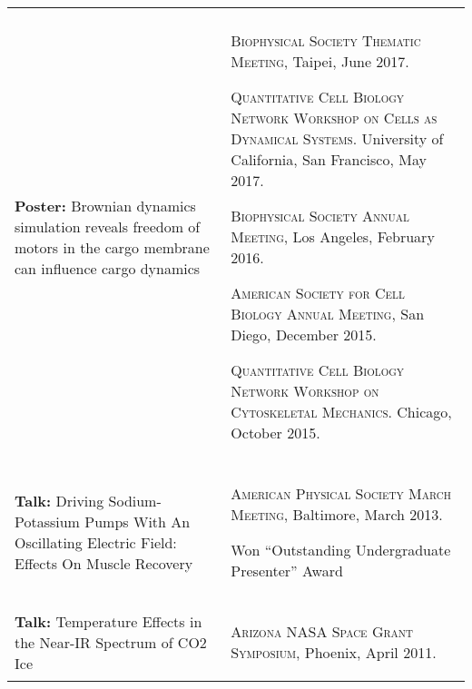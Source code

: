 \documentclass[letterpaper,10pt]{article} %
\makeatletter
\newcommand\cellwidth{\TX@col@width}
\makeatother
\begin{document}
\begin{tabularx}{\textwidth}{p{} | X}
\multicolumn{2}{c}{} \\

\begin{minipage}{.4\textwidth}
\textbf{Poster:} Brownian dynamics simulation reveals freedom of motors in the cargo membrane can influence cargo dynamics
\end{minipage}
&
\begin{minipage}{\cellwidth}
\begin{description}[itemsep=.25ex,labelsep=0em]
\item \textsc{Biophysical Society Thematic Meeting}, Taipei, June 2017.
\item \textsc{Quantitative Cell Biology Network Workshop on Cells as Dynamical Systems.} University of California, San Francisco, May 2017.
\item \textsc{Biophysical Society Annual Meeting}, Los Angeles, February 2016.
\item \textsc{American Society for Cell Biology Annual Meeting}, San Diego, December 2015.
\item \textsc{Quantitative Cell Biology Network Workshop on Cytoskeletal Mechanics.} Chicago, October 2015.
\end{description}
\end{minipage} \\

\multicolumn{2}{c}{} \\

\begin{minipage}{.4\textwidth}
\textbf{Talk:} Driving Sodium-Potassium Pumps With An Oscillating Electric Field: Effects On Muscle Recovery
\end{minipage}
&
\begin{minipage}{\cellwidth}
\begin{description}[itemsep=.25ex,labelsep=0em]
\item \textsc{American Physical Society March Meeting}, Baltimore, March 2013.
\item Won ``Outstanding Undergraduate Presenter'' Award
\end{description}
\end{minipage} \\

\multicolumn{2}{c}{} \\

\begin{minipage}{.4\textwidth}
\textbf{Talk:} Temperature Effects in the Near-IR Spectrum of CO2 Ice
\end{minipage}
&
\begin{minipage}{\cellwidth}
\begin{description}[itemsep=.25ex,labelsep=0em]
\item \textsc{Arizona NASA Space Grant Symposium}, Phoenix, April 2011.
\end{description}
\end{minipage}
\end{tabularx}
\end{document}
